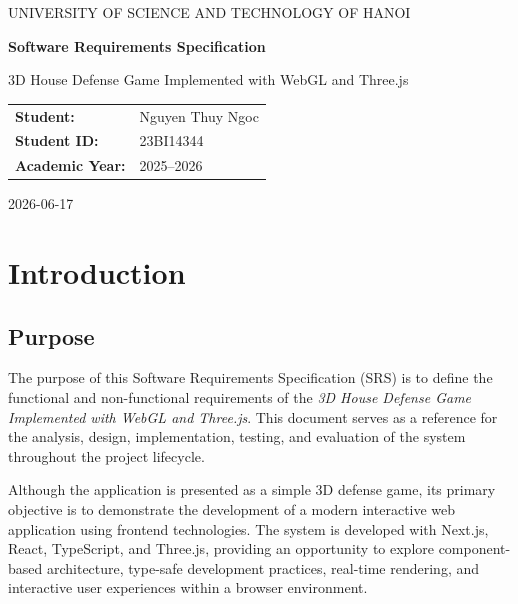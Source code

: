 \documentclass[11pt,a4paper]{article}
\begin{document}
\begin{titlepage}
  \centering
  \vspace*{2cm}

  {\large UNIVERSITY OF SCIENCE AND TECHNOLOGY OF HANOI\par}
  \vspace{2.5cm}

  {\Huge\bfseries Software Requirements Specification\par}
  \vspace{1.5cm}

  {\LARGE 3D House Defense Game Implemented with WebGL and Three.js\par}
  \vspace{3cm}

  \begin{tabular}{ll}
    \textbf{Student:}        & Nguyen Thuy Ngoc \\
    \textbf{Student ID:}     & 23BI14344 \\
    \textbf{Academic Year:}  & 2025--2026 \\
  \end{tabular}

  \vfill
  {\large 2026-06-17\par}
\end{titlepage}

\tableofcontents
\newpage

\section{Introduction}

\subsection{Purpose}

The purpose of this Software Requirements Specification (SRS) is to define the
functional and non-functional requirements of the \emph{3D House Defense Game
Implemented with WebGL and Three.js}. This document serves as a reference for
the analysis, design, implementation, testing, and evaluation of the system
throughout the project lifecycle.

Although the application is presented as a simple 3D defense game, its primary
objective is to demonstrate the development of a modern interactive web
application using frontend technologies. The system is developed with Next.js,
React, TypeScript, and Three.js, providing an opportunity to explore
component-based architecture, type-safe development practices, real-time
rendering, and interactive user experiences within a browser environment.
\end{document}
